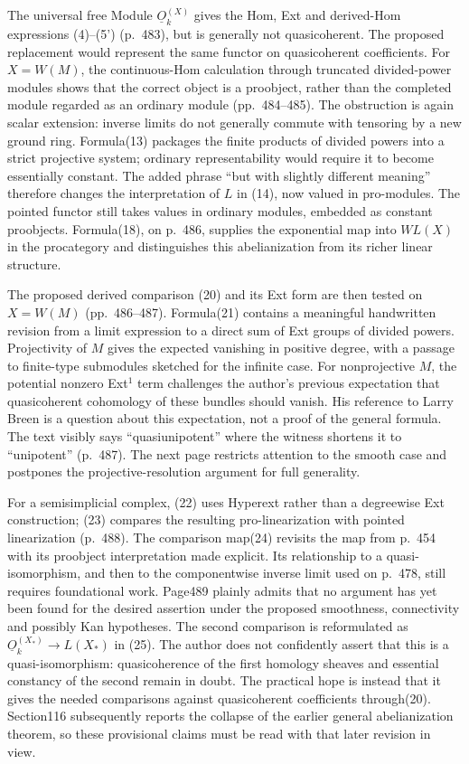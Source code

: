 The universal free Module $\underline O_k^{(X)}$ gives the Hom, Ext and derived-Hom expressions (4)--(5') (p.~483), but is generally not quasicoherent. The proposed replacement would represent the same functor on quasicoherent coefficients. For $X=W(M)$, the continuous-Hom calculation through truncated divided-power modules shows that the correct object is a proobject, rather than the completed module regarded as an ordinary module (pp.~484--485). The obstruction is again scalar extension: inverse limits do not generally commute with tensoring by a new ground ring. Formula(13) packages the finite products of divided powers into a strict projective system; ordinary representability would require it to become essentially constant. The added phrase ``but with slightly different meaning'' therefore changes the interpretation of $L$ in (14), now valued in pro-modules. The pointed functor still takes values in ordinary modules, embedded as constant proobjects. Formula(18), on p.~486, supplies the exponential map into $WL(X)$ in the procategory and distinguishes this abelianization from its richer linear structure.

The proposed derived comparison (20) and its Ext form are then tested on $X=W(M)$ (pp.~486--487). Formula(21) contains a meaningful handwritten revision from a limit expression to a direct sum of Ext groups of divided powers. Projectivity of $M$ gives the expected vanishing in positive degree, with a passage to finite-type submodules sketched for the infinite case. For nonprojective $M$, the potential nonzero Ext$^1$ term challenges the author's previous expectation that quasicoherent cohomology of these bundles should vanish. His reference to Larry Breen is a question about this expectation, not a proof of the general formula. The text visibly says ``quasiunipotent'' where the witness shortens it to ``unipotent'' (p.~487). The next page restricts attention to the smooth case and postpones the projective-resolution argument for full generality.

For a semisimplicial complex, (22) uses Hyperext rather than a degreewise Ext construction; (23) compares the resulting pro-linearization with pointed linearization (p.~488). The comparison map(24) revisits the map from p.~454 with its proobject interpretation made explicit. Its relationship to a quasi-isomorphism, and then to the componentwise inverse limit used on p.~478, still requires foundational work. Page489 plainly admits that no argument has yet been found for the desired assertion under the proposed smoothness, connectivity and possibly Kan hypotheses. The second comparison is reformulated as $\underline O_k^{(X_*)}\to L(X_*)$ in (25). The author does not confidently assert that this is a quasi-isomorphism: quasicoherence of the first homology sheaves and essential constancy of the second remain in doubt. The practical hope is instead that it gives the needed comparisons against quasicoherent coefficients through(20). Section116 subsequently reports the collapse of the earlier general abelianization theorem, so these provisional claims must be read with that later revision in view.

